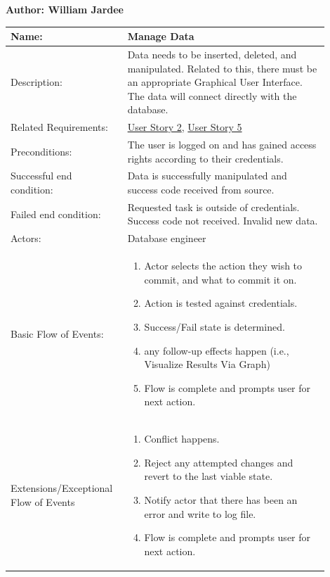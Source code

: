 \documentclass[11pt]{article}
\begin{document}
\begin{table}[!ht]
\begin{center}
\textbf{Author: William Jardee}
\vspace*{1em}

\begin{tabular}{p{0.30\linewidth}p{0.60\linewidth}}
	Name: & Manage Data\\\hline
	Description: & Data needs to be inserted, deleted, and manipulated. Related to this, there must be an appropriate Graphical User Interface. The data will connect directly with the database.\\\hline
	Related Requirements:& \hyperlink{us2}{User Story 2}, \hyperlink{us5}{User Story 5}\\\hline
	Preconditions:& The user is logged on and has gained access rights according to their credentials.\\\hline
	Successful end condition:& Data is successfully manipulated and success code received from source. \\\hline
	Failed end condition:& Requested task is outside of credentials. Success code not received. Invalid new data.\\\hline
	Actors:& Database engineer\\\hline
	Basic Flow of Events: & \begin{enumerate}
	\item Actor selects the action they wish to commit, and what to commit it on.
	\item Action is tested against credentials.
	\item Success/Fail state is determined.
	\item any follow-up effects happen (i.e., Visualize Results Via Graph)
	\item Flow is complete and prompts user for next action.
	\end{enumerate}\\\hline
	Extensions/Exceptional Flow of Events & \begin{enumerate}
	\item Conflict happens.
	\item Reject any attempted changes and revert to the last viable state.
	\item Notify actor that there has been an error and write to log file.
	\item Flow is complete and prompts user for next action.
	\end{enumerate}
\end{tabular}
\label{des:man_dat}	
\end{center}
\end{table}
\end{document}
